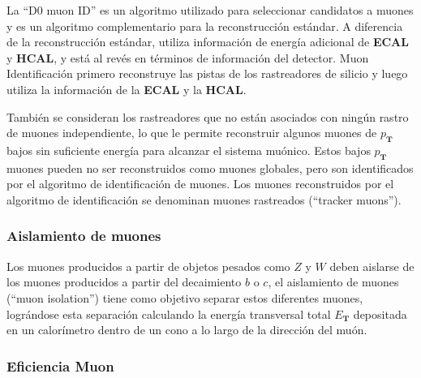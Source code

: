 La ``D0 muon ID'' es un algoritmo utilizado para seleccionar candidatos a muones y es un algoritmo complementario para la reconstrucción estándar. A diferencia de la reconstrucción estándar, utiliza información de energía adicional de \textbf{ECAL} y \textbf{HCAL}, y está al revés en términos de información del detector. Muon Identificación primero reconstruye las pistas de los rastreadores de silicio y luego utiliza la información de la \textbf{ECAL} y la \textbf{HCAL}.

También se consideran los rastreadores que no están asociados con ningún rastro de muones independiente, lo que le permite reconstruir algunos muones de $p_\mathbf{T}$ bajos sin suficiente energía para alcanzar el sistema muónico. Estos bajos $p_\mathbf{T}$ muones pueden no ser reconstruidos como muones globales, pero son identificados por el algoritmo de identificación de muones. Los muones reconstruidos por el algoritmo de identificación se denominan muones rastreados (``tracker muons'').

\subsubsection{Aislamiento de muones}

Los muones producidos a partir de objetos pesados como $Z$ y $W$ deben aislarse de los muones producidos a partir del decaimiento $b$ o $c$, el aislamiento de muones (``muon isolation'') tiene como objetivo separar estos diferentes muones, lográndose esta separación calculando la energía transversal total $E_\mathbf{T}$ depositada en un calorímetro dentro de un cono a lo largo de la dirección del muón.

\subsubsection{Eficiencia Muon}

